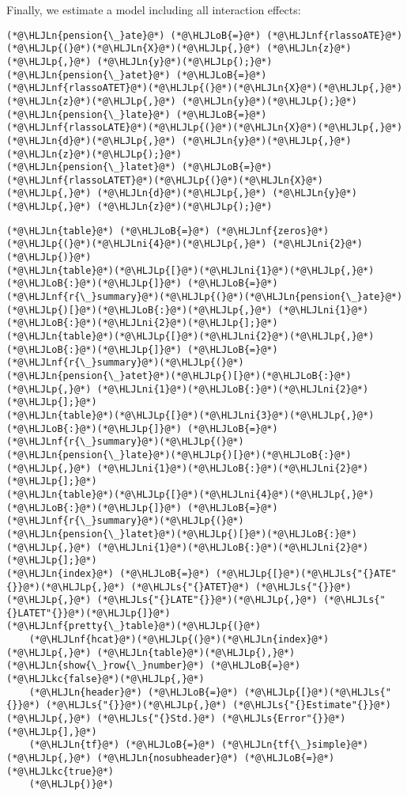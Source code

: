 \documentclass[12pt,a4paper]{article}
\newcommand{\HLJLkc}[1]{\textcolor[RGB]{59,151,46}{\textit{#1}}}
\newcommand{\HLJLn}[1]{#1}
\newcommand{\HLJLnf}[1]{\textcolor[RGB]{66,102,213}{#1}}
\newcommand{\HLJLs}[1]{\textcolor[RGB]{201,61,57}{#1}}
\newcommand{\HLJLni}[1]{\textcolor[RGB]{59,151,46}{#1}}
\newcommand{\HLJLoB}[1]{\textcolor[RGB]{102,102,102}{\textbf{#1}}}
\newcommand{\HLJLp}[1]{#1}
\begin{document}
Finally, we estimate a model including all interaction effects:


\begin{lstlisting}
(*@\HLJLn{pension{\_}ate}@*) (*@\HLJLoB{=}@*) (*@\HLJLnf{rlassoATE}@*)(*@\HLJLp{(}@*)(*@\HLJLn{X}@*)(*@\HLJLp{,}@*) (*@\HLJLn{z}@*)(*@\HLJLp{,}@*) (*@\HLJLn{y}@*)(*@\HLJLp{);}@*)
(*@\HLJLn{pension{\_}atet}@*) (*@\HLJLoB{=}@*) (*@\HLJLnf{rlassoATET}@*)(*@\HLJLp{(}@*)(*@\HLJLn{X}@*)(*@\HLJLp{,}@*) (*@\HLJLn{z}@*)(*@\HLJLp{,}@*) (*@\HLJLn{y}@*)(*@\HLJLp{);}@*)
(*@\HLJLn{pension{\_}late}@*) (*@\HLJLoB{=}@*) (*@\HLJLnf{rlassoLATE}@*)(*@\HLJLp{(}@*)(*@\HLJLn{X}@*)(*@\HLJLp{,}@*) (*@\HLJLn{d}@*)(*@\HLJLp{,}@*) (*@\HLJLn{y}@*)(*@\HLJLp{,}@*) (*@\HLJLn{z}@*)(*@\HLJLp{);}@*)
(*@\HLJLn{pension{\_}latet}@*) (*@\HLJLoB{=}@*) (*@\HLJLnf{rlassoLATET}@*)(*@\HLJLp{(}@*)(*@\HLJLn{X}@*)(*@\HLJLp{,}@*) (*@\HLJLn{d}@*)(*@\HLJLp{,}@*) (*@\HLJLn{y}@*)(*@\HLJLp{,}@*) (*@\HLJLn{z}@*)(*@\HLJLp{);}@*)
\end{lstlisting}


\begin{lstlisting}
(*@\HLJLn{table}@*) (*@\HLJLoB{=}@*) (*@\HLJLnf{zeros}@*)(*@\HLJLp{(}@*)(*@\HLJLni{4}@*)(*@\HLJLp{,}@*) (*@\HLJLni{2}@*)(*@\HLJLp{)}@*)
(*@\HLJLn{table}@*)(*@\HLJLp{[}@*)(*@\HLJLni{1}@*)(*@\HLJLp{,}@*)(*@\HLJLoB{:}@*)(*@\HLJLp{]}@*) (*@\HLJLoB{=}@*) (*@\HLJLnf{r{\_}summary}@*)(*@\HLJLp{(}@*)(*@\HLJLn{pension{\_}ate}@*)(*@\HLJLp{)[}@*)(*@\HLJLoB{:}@*)(*@\HLJLp{,}@*) (*@\HLJLni{1}@*)(*@\HLJLoB{:}@*)(*@\HLJLni{2}@*)(*@\HLJLp{];}@*)
(*@\HLJLn{table}@*)(*@\HLJLp{[}@*)(*@\HLJLni{2}@*)(*@\HLJLp{,}@*)(*@\HLJLoB{:}@*)(*@\HLJLp{]}@*) (*@\HLJLoB{=}@*) (*@\HLJLnf{r{\_}summary}@*)(*@\HLJLp{(}@*)(*@\HLJLn{pension{\_}atet}@*)(*@\HLJLp{)[}@*)(*@\HLJLoB{:}@*)(*@\HLJLp{,}@*) (*@\HLJLni{1}@*)(*@\HLJLoB{:}@*)(*@\HLJLni{2}@*)(*@\HLJLp{];}@*)
(*@\HLJLn{table}@*)(*@\HLJLp{[}@*)(*@\HLJLni{3}@*)(*@\HLJLp{,}@*)(*@\HLJLoB{:}@*)(*@\HLJLp{]}@*) (*@\HLJLoB{=}@*) (*@\HLJLnf{r{\_}summary}@*)(*@\HLJLp{(}@*)(*@\HLJLn{pension{\_}late}@*)(*@\HLJLp{)[}@*)(*@\HLJLoB{:}@*)(*@\HLJLp{,}@*) (*@\HLJLni{1}@*)(*@\HLJLoB{:}@*)(*@\HLJLni{2}@*)(*@\HLJLp{];}@*)
(*@\HLJLn{table}@*)(*@\HLJLp{[}@*)(*@\HLJLni{4}@*)(*@\HLJLp{,}@*)(*@\HLJLoB{:}@*)(*@\HLJLp{]}@*) (*@\HLJLoB{=}@*) (*@\HLJLnf{r{\_}summary}@*)(*@\HLJLp{(}@*)(*@\HLJLn{pension{\_}latet}@*)(*@\HLJLp{)[}@*)(*@\HLJLoB{:}@*)(*@\HLJLp{,}@*) (*@\HLJLni{1}@*)(*@\HLJLoB{:}@*)(*@\HLJLni{2}@*)(*@\HLJLp{];}@*)
(*@\HLJLn{index}@*) (*@\HLJLoB{=}@*) (*@\HLJLp{[}@*)(*@\HLJLs{"{}ATE"{}}@*)(*@\HLJLp{,}@*) (*@\HLJLs{"{}ATET}@*) (*@\HLJLs{"{}}@*)(*@\HLJLp{,}@*) (*@\HLJLs{"{}LATE"{}}@*)(*@\HLJLp{,}@*) (*@\HLJLs{"{}LATET"{}}@*)(*@\HLJLp{]}@*)
(*@\HLJLnf{pretty{\_}table}@*)(*@\HLJLp{(}@*)
    (*@\HLJLnf{hcat}@*)(*@\HLJLp{(}@*)(*@\HLJLn{index}@*)(*@\HLJLp{,}@*) (*@\HLJLn{table}@*)(*@\HLJLp{),}@*) (*@\HLJLn{show{\_}row{\_}number}@*) (*@\HLJLoB{=}@*) (*@\HLJLkc{false}@*)(*@\HLJLp{,}@*) 
    (*@\HLJLn{header}@*) (*@\HLJLoB{=}@*) (*@\HLJLp{[}@*)(*@\HLJLs{"{}}@*) (*@\HLJLs{"{}}@*)(*@\HLJLp{,}@*) (*@\HLJLs{"{}Estimate"{}}@*)(*@\HLJLp{,}@*) (*@\HLJLs{"{}Std.}@*) (*@\HLJLs{Error"{}}@*)(*@\HLJLp{],}@*) 
    (*@\HLJLn{tf}@*) (*@\HLJLoB{=}@*) (*@\HLJLn{tf{\_}simple}@*)(*@\HLJLp{,}@*) (*@\HLJLn{nosubheader}@*) (*@\HLJLoB{=}@*) (*@\HLJLkc{true}@*)
    (*@\HLJLp{)}@*)
\end{lstlisting}
\end{document}
